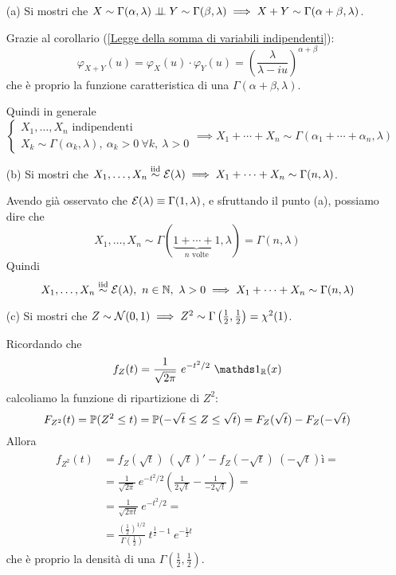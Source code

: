 \begin{enumerate}

\item [(a)] Si mostri che $X\sim\Gamma(\alpha,\lambda)\perp \!\!\! \perp Y\sim\Gamma(\beta,\lambda)\implies X+Y\sim\Gamma(\alpha+\beta,\lambda)$.

Grazie al corollario (\ref{Legge della somma di variabili indipendenti}):
\[
\varphi_{X+Y}(u)=\varphi_X(u)\cdot\varphi_Y(u)=\left(\frac{\lambda}{\lambda-iu}\right)^{\alpha+\beta}
\]
che è proprio la funzione caratteristica di una $\Gamma(\alpha+\beta,\lambda)$.

Quindi in generale
\[
\begin{cases}X_1,\dots,X_n\text{ indipendenti}\\X_k\sim\Gamma(\alpha_k,\lambda),\ \alpha_k>0\ \forall k,\ \lambda>0\end{cases} \implies X_1+\cdots+X_n\sim\Gamma(\alpha_1+\cdots+\alpha_n,\lambda)
\]

\item [(b)] Si mostri che $X_1,\dots,X_n\stackrel{\mathrm{iid}}{\sim}\mathcal{E}(\lambda)\implies X_1+\cdots+X_n\sim\Gamma(n,\lambda)$.

Avendo già osservato che $\mathcal{E}(\lambda)\equiv\Gamma(1,\lambda)$, e sfruttando il punto (a), possiamo dire che
\[
X_1,\dots,X_n\sim\Gamma(\underbrace{1+\cdots+1}_{n\text{ volte}},\lambda)=\Gamma(n,\lambda)
\]
Quindi
\[
X_1,\dots,X_n\iid\Ec(\lambda),\ n\in\NN,\ \lambda>0\implies X_1+\cdots+X_n\sim\Gamma(n,\lambda)
\]

\item [(c)] Si mostri che $Z\sim\mathcal{N}(0,1)\implies Z^2\sim\Gamma\left(\frac{1}{2},\frac{1}{2}\right)=\chi^2(1)$.

Ricordando che
\[
f_Z(t)=\frac{1}{\sqrt{2\pi}}\ e^{-t^2/2}\ \Ind_\RR(x)
\]
calcoliamo la funzione di ripartizione di $Z^2$:
\[
F_{Z^2}(t)=\mathbb{P}(Z^2\leq t)=\mathbb{P}(-\sqrt{t}\leq Z\leq\sqrt{t})=F_Z(\sqrt{t})-F_Z(-\sqrt{t})
\]
Allora
\begin{gather*}
\begin{aligned}
f_{Z^2}(t)&=f_Z(\sqrt{t})\ (\sqrt{t})'-f_Z(-\sqrt{t})\ (-\sqrt{t})ì=\\
&=\frac{1}{\sqrt{2\pi}}\ e^{-t^2/2}\left(\frac{1}{2\sqrt{t}}-\frac{1}{-2\sqrt{t}}  \right)=\\
&=\frac{1}{\sqrt{2\pi t}}\ e^{-t^2/2}=\\
&=\frac{\left(\frac{1}{2}  \right)^{1/2}}{\Gamma\left(\frac{1}{2}  \right)}\ t^{\frac{1}{2}-1}\ e^{-\frac{1}{2}t}
\end{aligned}
\end{gather*}
che è proprio la densità di una $\Gamma\left(\frac{1}{2},\frac{1}{2} \right)$.


\end{enumerate}
